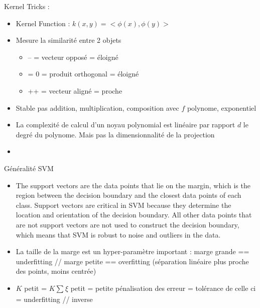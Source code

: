 \documentclass{article}
\begin{document}
Kernel Tricks : 
\begin{itemize}
    \item Kernel Function : $ k(x,y) = <\phi (x), \phi(y)> $
    \item Mesure la similarité entre 2 objets \begin{itemize}
        \item -- = vecteur opposé = éloigné
        \item = 0 = produit orthogonal = éloigné 
        \item ++ = vecteur aligné = proche
    \end{itemize}
    \item Stable pas addition, multiplication, composition avec $ f $ polynome, exponentiel
    \item La complexité de calcul d'un noyau polynomial est linéaire par rapport $d$ le degré du polynome. Mais pas la dimensionnalité de la projection
    \item 
\end{itemize}

Généralité SVM 
\begin{itemize}
    \item The support vectors are the data points that lie on the margin, which is the region between the decision boundary and the closest data points of each class. Support vectors are critical in SVM because they determine the location and orientation of the decision boundary. All other data points that are not support vectors are not used to construct the decision boundary, which means that SVM is robust to noise and outliers in the data.
    \item La taille de la marge est un hyper-paramètre important : marge grande == underfitting // marge petite == overfitting (séparation linéaire plus proche des points, moins centrée)
    \item $ K $ petit = $ K \sum_{}^{}\xi  $ petit = petite pénalisation des erreur = tolérance de celle ci = underfitting // inverse
\end{itemize}
\end{document}
